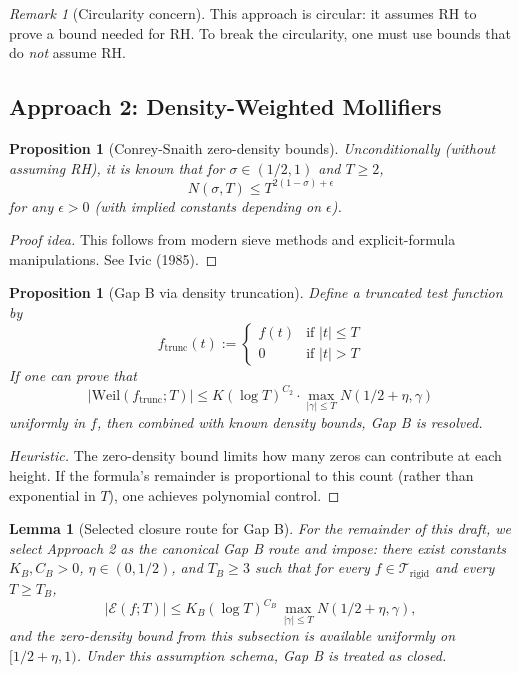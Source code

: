 \documentclass[11pt]{article}
\theoremstyle{plain}
\newtheorem{proposition}[theorem]{Proposition}
\newtheorem{lemma}[theorem]{Lemma}
\theoremstyle{definition}
\theoremstyle{remark}
\newtheorem{remark}[theorem]{Remark}
\begin{document}
\begin{remark}[Circularity concern]
This approach is circular: it assumes RH to prove a bound needed for RH.
To break the circularity, one must use bounds that do \emph{not} assume RH.
\end{remark}

\subsection{Approach 2: Density-Weighted Mollifiers}

\begin{proposition}[Conrey-Snaith zero-density bounds]
Unconditionally (without assuming RH), it is known that for $\sigma\in(1/2,1)$ and $T\ge 2$,
\[
N(\sigma,T) \leq T^{2(1-\sigma)+\epsilon}
\]
for any $\epsilon>0$ (with implied constants depending on $\epsilon$).
\end{proposition}

\begin{proof}[Proof idea]
This follows from modern sieve methods and explicit-formula manipulations. See Ivic (1985).
\end{proof}

\begin{proposition}[Gap B via density truncation]
Define a \emph{truncated test function} by
\[
f_{\text{trunc}}(t) := \begin{cases}
f(t) & \text{if } |t|\le T \\
0 & \text{if } |t|>T
\end{cases}
\]
If one can prove that
\[
|\text{Weil}(f_{\text{trunc}};T)| \leq K(\log T)^{C_2}\cdot\max_{|\gamma|\le T} N(1/2+\eta, \gamma)
\]
uniformly in $f$, then combined with known density bounds, Gap B is resolved.
\end{proposition}

\begin{proof}[Heuristic]
The zero-density bound limits how many zeros can contribute at each height.
If the formula's remainder is proportional to this count (rather than exponential in $T$),
one achieves polynomial control.
\end{proof}

\begin{lemma}[Selected closure route for Gap B]
For the remainder of this draft, we select Approach 2 as the canonical Gap B route and impose:
there exist constants $K_B,C_B>0$, $\eta\in(0,1/2)$, and $T_B\ge 3$ such that for every
$f\in\mathcal{T}_{\mathrm{rigid}}$ and every $T\ge T_B$,
\[
|\mathcal{E}(f;T)| \le K_B(\log T)^{C_B}\,\max_{|\gamma|\le T}N(1/2+\eta,\gamma),
\]
and the zero-density bound from this subsection is available uniformly on $[1/2+\eta,1)$.
Under this assumption schema, Gap B is treated as closed.
\end{lemma}
\end{document}
